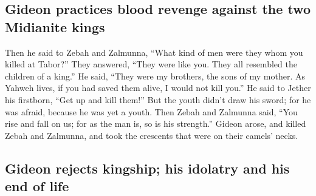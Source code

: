 \begin{paracol}{2}
\begin{otherlanguage}{english}
\hypertarget{gideon-practices-blood-revenge-against-the-two-midianite-kings}{%
\subsection{Gideon practices blood revenge against the two Midianite
kings}\label{gideon-practices-blood-revenge-against-the-two-midianite-kings}}

 Then he said to Zebah and Zalmunna, ``What kind of men
were they whom you killed at Tabor?'' They answered, ``They were like
you. They all resembled the children of a king.''  He
said, ``They were my brothers, the sons of my mother. As Yahweh lives,
if you had saved them alive, I would not kill you.''  He
said to Jether his firstborn, ``Get up and kill them!'' But the youth
didn't draw his sword; for he was afraid, because he was yet a youth.
 Then Zebah and Zalmunna said, ``You rise and fall on us;
for as the man is, so is his strength.'' Gideon arose, and killed Zebah
and Zalmunna, and took the crescents that were on their camels' necks.

\hypertarget{gideon-rejects-kingship-his-idolatry-and-his-end-of-life}{%
\subsection{Gideon rejects kingship; his idolatry and his end of
life}\label{gideon-rejects-kingship-his-idolatry-and-his-end-of-life}}


\end{otherlanguage}
\end{paracol}
